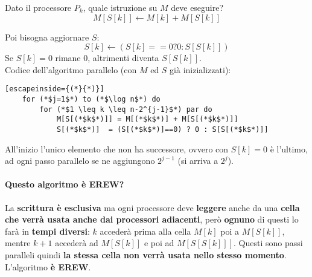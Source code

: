 Dato il processore $P_k$, quale istruzione su $M$ deve eseguire? 
$$ M[S[k]] \leftarrow M[k] + M[S[k]] $$

Poi bisogna aggiornare $S$:
$$ S[k] \leftarrow \left(S[k] == 0? 0 : S[S[k]] \right) $$
Se $S[k] = 0$ rimane $0$, altrimenti diventa $S[S[k]]$.\\

Codice dell'algoritmo parallelo (con $M$ ed $S$ già inizializzati):
\begin{lstlisting}[escapeinside={(*}{*)}]
	for (*$j=1$*) to (*$\log n$*) do 
		for (*$1 \leq k \leq n-2^{j-1}$*) par do
			M[S[(*$k$*)]] = M[(*$k$*)] + M[S[(*$k$*)]]
			S[(*$k$*)]  = (S[(*$k$*)]==0) ? 0 : S[S[(*$k$*)]]
\end{lstlisting}

All'inizio l'unico elemento che non ha successore, ovvero con $S[k] = 0$ è l'ultimo, ad ogni passo parallelo se ne aggiungono $2^{j-1}$ (si arriva a $2^j$).\\

\newpage

\paragraph{Questo algoritmo è EREW?} La \textbf{scrittura è esclusiva} ma ogni processore deve \textbf{leggere} anche da una \textbf{cella che verrà usata anche dai processori adiacenti}, però \textbf{ognuno} di questi lo farà in \textbf{tempi diversi}: $k$ accederà prima alla cella $M[k]$ poi a $M[S[k]]$, mentre $k+1$ accederà ad $M[S[k]]$ e poi ad $M[S[S[k]]]$. Questi sono passi paralleli quindi \textbf{la stessa cella non verrà usata nello stesso momento}.\\
L'algoritmo \textbf{è EREW}.\\


